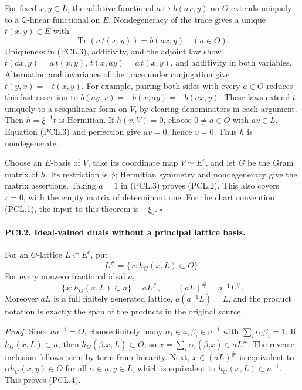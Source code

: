 \documentclass[11pt,a4paper]{article}
\numberwithin{equation}{section}
\theoremstyle{remark}\newtheorem{remark}[theorem]{Remark}
\begin{document}
For fixed \(x,y\in L\), the additive functional
\(a\mapsto b(ax,y)\) on \(O\) extends uniquely to a
\(\mathbb Q\)-linear functional on \(E\).  Nondegeneracy
of the trace gives a unique \(t(x,y)\in E\) with
\[
 \operatorname{Tr}(a\,t(x,y))=b(ax,y)\quad(a\in O).
                                                               \tag{PCL.3}
\]
Uniqueness in (PCL.3), additivity, and the adjoint law show
\(t(ax,y)=a\,t(x,y)\),
\(t(x,ay)=\bar a\,t(x,y)\), and additivity in both variables.
Alternation and invariance of the trace under conjugation give
\(t(y,x)=-\overline{t(x,y)}\).  For example, pairing both
sides with every \(a\in O\) reduces this last assertion to
\(b(ay,x)=-b(x,ay)=-b(\bar a x,y)\).
These laws extend \(t\) uniquely to a sesquilinear form on
\(V\), by clearing denominators in each argument.  Then
\(h=\xi^{-1}t\) is Hermitian.  If \(h(v,V)=0\), choose
\(0\ne a\in O\) with \(av\in L\).  Equation (PCL.3) and
perfection give \(av=0\), hence \(v=0\).  Thus \(h\) is
nondegenerate.

Choose an \(E\)-basis of \(V\), take its coordinate map
\(V\simeq E^r\), and let \(G\) be the Gram matrix of \(h\).
Its restriction is \(\phi\); Hermitian symmetry and
nondegeneracy give the matrix assertions.  Taking \(a=1\)
in (PCL.3) proves (PCL.2).  This also covers \(r=0\), with
the empty matrix of determinant one.  For the chart convention
(PCL.1), the input to this theorem is \(-\xi_0\).
\hfill\(\square\)

\paragraph{PCL2. Ideal-valued duals without a principal lattice basis.}
\label{claim:PCL2}
For an \(O\)-lattice \(L\subset E^r\), put
\[
 L^\#=\{x:h_G(x,L)\subset O\}.
\]
For every nonzero fractional ideal \(a\),
\[
 \{x:h_G(x,L)\subset a\}=aL^\#,
 \qquad (aL)^\#=\bar a^{-1}L^\#.                    \tag{PCL.4}
\]
Moreover \(aL\) is a full finitely generated lattice,
\(a(a^{-1}L)=L\), and the product notation is exactly the
span of the products in the original source.

\emph{Proof.}
Since \(aa^{-1}=O\), choose finitely many
\(\alpha_i\in a,\beta_i\in a^{-1}\) with
\(\sum_i\alpha_i\beta_i=1\).  If \(h_G(x,L)\subset a\),
then \(h_G(\beta_i x,L)\subset O\), so
\(x=\sum_i\alpha_i(\beta_i x)\in aL^\#\).
The reverse inclusion follows term by term from linearity.
Next, \(x\in(aL)^\#\) is equivalent to
\(\bar\alpha h_G(x,y)\in O\) for all
\(\alpha\in a,y\in L\), which is equivalent to
\(h_G(x,L)\subset\bar a^{-1}\).  This proves (PCL.4).
\end{document}
